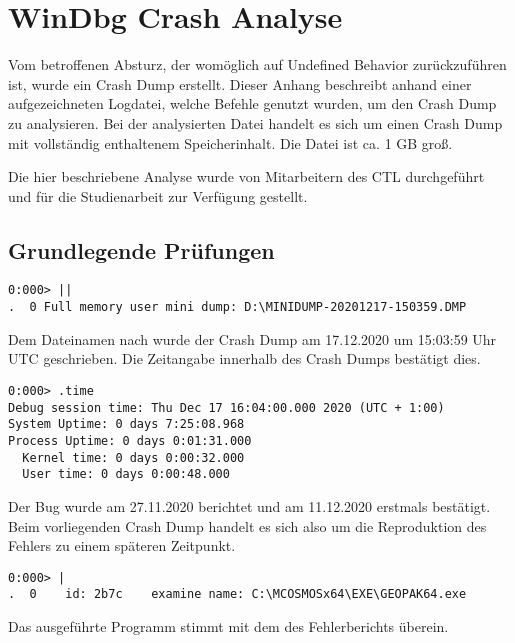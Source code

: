\lstset{language=WinDbg}

\section{WinDbg Crash Analyse}
Vom betroffenen Absturz, der womöglich auf Undefined Behavior zurückzuführen ist, wurde ein Crash Dump erstellt.
Dieser Anhang beschreibt anhand einer aufgezeichneten Logdatei, welche Befehle genutzt wurden, um den Crash Dump zu analysieren.
Bei der analysierten Datei handelt es sich um einen Crash Dump mit vollständig enthaltenem Speicherinhalt. Die Datei ist ca. 1 GB groß.

Die hier beschriebene Analyse wurde von Mitarbeitern des CTL durchgeführt und für die Studienarbeit zur Verfügung gestellt.

\subsection{Grundlegende Prüfungen}
\begin{lstlisting}
0:000> ||
.  0 Full memory user mini dump: D:\MINIDUMP-20201217-150359.DMP
\end{lstlisting}
Dem Dateinamen nach wurde der Crash Dump am 17.12.2020 um 15:03:59 Uhr UTC geschrieben. Die Zeitangabe innerhalb des Crash Dumps bestätigt dies.

\begin{lstlisting}
0:000> .time
Debug session time: Thu Dec 17 16:04:00.000 2020 (UTC + 1:00)
System Uptime: 0 days 7:25:08.968
Process Uptime: 0 days 0:01:31.000
  Kernel time: 0 days 0:00:32.000
  User time: 0 days 0:00:48.000
\end{lstlisting}
Der Bug wurde am 27.11.2020 berichtet und am 11.12.2020 erstmals bestätigt. Beim vorliegenden Crash Dump handelt es sich also um die Reproduktion des Fehlers zu einem späteren Zeitpunkt.

\begin{lstlisting}
0:000> |
.  0	id: 2b7c	examine	name: C:\MCOSMOSx64\EXE\GEOPAK64.exe
\end{lstlisting}
Das ausgeführte Programm stimmt mit dem des Fehlerberichts überein.


